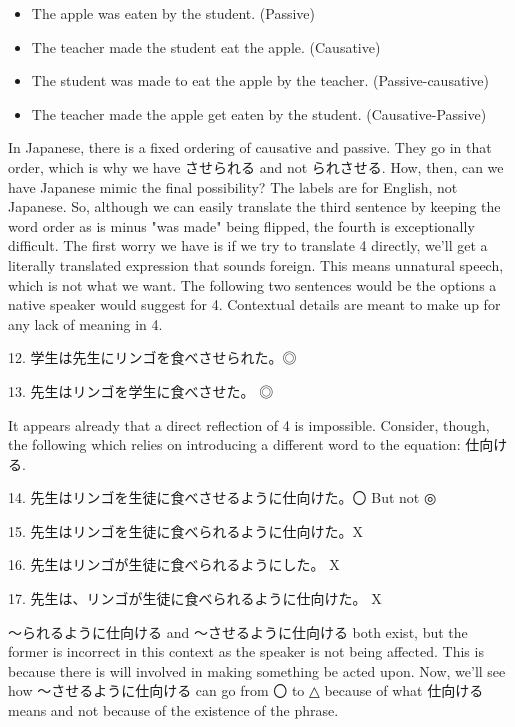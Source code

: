 \begin{itemize}

\item The apple was eaten by the student. (Passive) 
\item The teacher made the student eat the apple. (Causative) 
\item The student was made to eat the apple by the teacher. (Passive-causative) 
\item The teacher made the apple get eaten by the student. (Causative-Passive) 
\end{itemize}
 In Japanese, there is a fixed ordering of causative and passive. They go in that order, which is why we have させられる and not られさせる. How, then, can we have Japanese mimic the final possibility? The labels are for English, not Japanese. So, although we can easily translate the third sentence by keeping the word order as is minus "was made" being flipped, the fourth is exceptionally difficult.   The first worry we have is if we try to translate 4 directly, we'll get a literally translated expression that sounds foreign. This means unnatural speech, which is not what we want. The following two sentences would be the options a native speaker would suggest for 4. Contextual details are meant to make up for any lack of meaning in 4. 
\par{12. 学生は先生にリンゴを食べさせられた。◎ }

\par{13. 先生はリンゴを学生に食べさせた。 ◎ }

\par{ It appears already that a direct reflection of 4 is impossible. Consider, though, the following which relies on introducing a different word to the equation: 仕向ける. }

\par{14. 先生はリンゴを生徒に食べさせるように仕向けた。〇 But not ◎ }

\par{15. 先生はリンゴを生徒に食べられるように仕向けた。X }

\par{16. 先生はリンゴが生徒に食べられるようにした。 X }

\par{17. 先生は、リンゴが生徒に食べられるように仕向けた。 X }

\par{ ～られるように仕向ける and ～させるように仕向ける both exist, but the former is incorrect in this context as the speaker is not being affected. This is because there is will involved in making something be acted upon. Now, we'll see how ～させるように仕向ける can go from 〇 to △ because of what 仕向ける means and not because of the existence of the phrase. }

